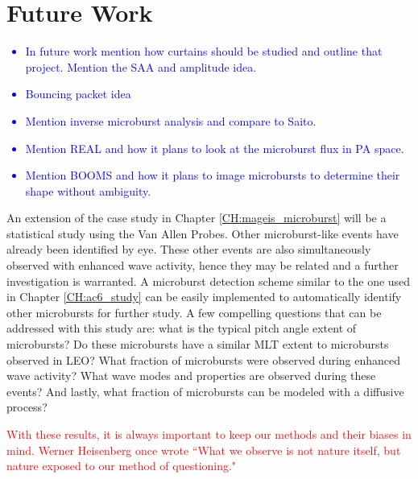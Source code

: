\section{Future Work}
\textcolor{blue}{
\begin{itemize}
\item In future work mention how curtains should be studied and outline that project. Mention the SAA and amplitude idea.
\item Bouncing packet idea
\item Mention inverse microburst analysis and compare to Saito.
\item Mention REAL and how it plans to look at the microburst flux in PA space.
\item Mention BOOMS and how it plans to image microbursts to determine their shape without ambiguity. 
\end{itemize}
}

An extension of the case study in Chapter \ref{CH:mageis_microburst} will be a statistical study using the Van Allen Probes. Other microburst-like events have already been identified by eye. These other events are also simultaneously observed with enhanced wave activity, hence they may be related and a further investigation is warranted. A microburst detection scheme similar to the one used in Chapter \ref{CH:ac6_study} can be easily implemented to automatically identify other microbursts for further study. A few compelling questions that can be addressed with this study are: what is the typical pitch angle extent of microbursts? Do these microbursts have a similar MLT extent to microbursts observed in LEO? What fraction of microbursts were observed during enhanced wave activity? What wave modes and properties are observed during these events? And lastly, what fraction of microbursts can be modeled with a diffusive process?



\textcolor{red}{With these results, it is always important to keep our methods and their biases in mind. Werner Heisenberg once wrote ``What we observe is not nature itself, but nature exposed to our method of questioning." \citet{Heisenberg1958}}